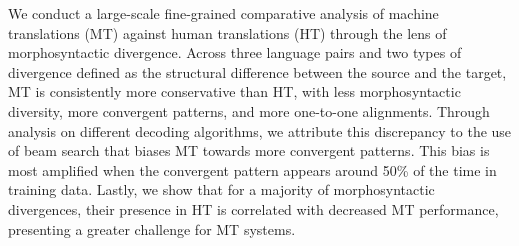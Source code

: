 We conduct a large-scale fine-grained comparative analysis of machine translations (MT) against human translations (HT) through the lens of morphosyntactic divergence. Across three language pairs and two types of divergence defined as the structural difference between the source and the target, MT is consistently more conservative than HT, with less morphosyntactic diversity, more convergent patterns, and more one-to-one alignments. Through analysis on different decoding algorithms, we attribute this discrepancy to the use of beam search that biases MT towards more convergent patterns. This bias is most amplified when the convergent pattern appears around 50\% of the time in training data. Lastly, we show that for a majority of morphosyntactic divergences, their presence in HT is correlated with decreased MT performance, presenting a greater challenge for MT systems.